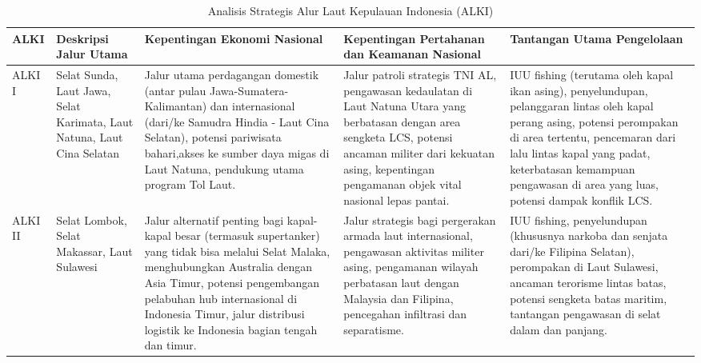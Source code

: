 \documentclass[12pt, a4paper]{article}
\begin{document}
\begin{table}[H]
\centering
\caption{Analisis Strategis Alur Laut Kepulauan Indonesia (ALKI)}
\label{tab:strategis_alur_laut}
\begin{tabular}{|>{\RaggedRight}p{}|>{\RaggedRight}p{}|>{\RaggedRight}p{}|>{\RaggedRight}p{}|>{\RaggedRight}p{}|}
\hline
\textbf{ALKI} & \textbf{Deskripsi Jalur Utama} & \textbf{Kepentingan Ekonomi Nasional} &	\textbf{Kepentingan Pertahanan dan Keamanan Nasional} & \textbf{Tantangan Utama Pengelolaan}\\
\hline
ALKI I & Selat Sunda, Laut Jawa, Selat Karimata, Laut Natuna, Laut Cina Selatan &	Jalur utama perdagangan domestik (antar pulau Jawa-Sumatera-Kalimantan) dan internasional (dari/ke Samudra Hindia - Laut Cina Selatan), potensi pariwisata bahari,akses ke sumber daya migas di Laut Natuna, pendukung utama program Tol Laut.&	Jalur patroli strategis TNI AL, pengawasan kedaulatan di Laut Natuna Utara yang berbatasan dengan area sengketa LCS, potensi ancaman militer dari kekuatan asing, kepentingan pengamanan objek vital nasional lepas pantai. &	IUU fishing (terutama oleh kapal ikan asing), penyelundupan, pelanggaran lintas oleh kapal perang asing, potensi perompakan di area tertentu, pencemaran dari lalu lintas kapal yang padat, keterbatasan kemampuan pengawasan di area yang luas, potensi dampak konflik LCS. \\
\hline
ALKI II &	Selat Lombok, Selat Makassar, Laut Sulawesi &	Jalur alternatif penting bagi kapal-kapal besar (termasuk supertanker) yang tidak bisa melalui Selat Malaka, menghubungkan Australia dengan Asia Timur, potensi pengembangan pelabuhan hub internasional di Indonesia Timur, jalur distribusi logistik ke Indonesia bagian tengah dan timur. &Jalur strategis bagi pergerakan armada laut internasional, pengawasan aktivitas militer asing, pengamanan wilayah perbatasan laut dengan Malaysia dan Filipina, pencegahan infiltrasi dan separatisme. &IUU fishing, penyelundupan (khususnya narkoba dan senjata dari/ke Filipina Selatan), perompakan di Laut Sulawesi, ancaman terorisme lintas batas, potensi sengketa batas maritim, tantangan pengawasan di selat dalam dan panjang. \\
\hline
\end{tabular}
\end{table}
\end{document}

